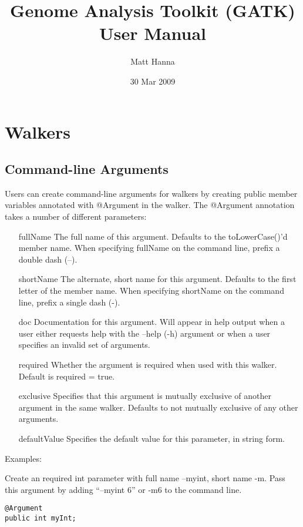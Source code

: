 \documentclass[11pt,fullpage]{article}
\begin{document}
\title{Genome Analysis Toolkit (GATK) User Manual}
\author{Matt Hanna}
\date{30 Mar 2009}
\maketitle

\section{Walkers}
\subsection{Command-line Arguments}
Users can create command-line arguments for walkers by creating public
member variables annotated with @Argument in the walker.  The
@Argument annotation takes a number of different parameters:

\begin{enumerate}
  \item [fullName] The full name of this argument.  Defaults to the
    toLowerCase()'d member name.  When specifying fullName on the 
    command line, prefix a double dash (--).
  \item [shortName] The alternate, short name for this argument.
    Defaults to the first letter of the member name.  When specifying 
    shortName on the command line, prefix a single dash (-).
  \item [doc] Documentation for this argument.  Will appear in help
    output when a user either requests help with the --help (-h)
    argument or when a user specifies an invalid set of arguments.
  \item [required] Whether the argument is required when used with
    this walker.  Default is required = true.
  \item [exclusive] Specifies that this argument is mutually
    exclusive of another argument in the same walker.  Defaults to not
    mutually exclusive of any other arguments.
  \item [defaultValue] Specifies the default value for this parameter,
    in string form.  
\end{enumerate}

Examples:

Create an required int parameter with full name --myint, short name
-m.
Pass this argument by adding ``--myint 6'' or -m6 to the command line.
\begin{verbatim}
@Argument
public int myInt;
\end{verbatim}
\end{document}
